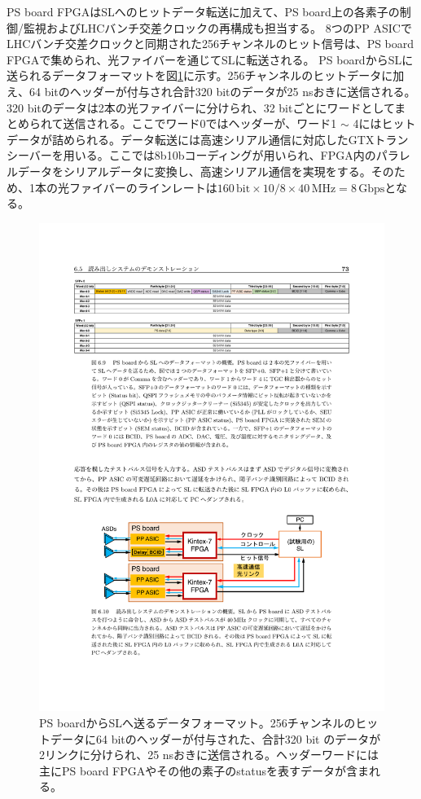     PS board FPGAはSLへのヒットデータ転送に加えて、PS board上の各素子の制御/監視およびLHCバンチ交差クロックの再構成も担当する。
    8つのPP ASICでLHCバンチ交差クロックと同期された256チャンネルのヒット信号は、PS board FPGAで集められ、光ファイバーを通じてSLに転送される。
    PS boardからSLに送られるデータフォーマットを図\ref{TGC_PSBuplink}に示す。256チャンネルのヒットデータに加え、64 bitのヘッダーが付与され合計320 bitのデータが25 nsおきに送信される。320 bitのデータは2本の光ファイバーに分けられ、32 bitごとにワードとしてまとめられて送信される。ここでワード0ではヘッダーが、ワード1 $\sim$ 4にはヒットデータが詰められる。データ転送には高速シリアル通信に対応したGTXトランシーバーを用いる。ここでは8b10bコーディングが用いられ、FPGA内のパラレルデータをシリアルデータに変換し、高速シリアル通信を実現をする。そのため、1本の光ファイバーのラインレートは$160 \, \mathrm{bit} \times 10/8 \times 40 \mathrm{\,MHz} = 8 \,\mathrm{Gbps}$となる。

    \begin{figure} 
    \centering
    \includegraphics[width=16cm]{fig/Intro/TGC_PSBuplink.pdf}
    \caption[PS boardからSLへ送るデータフォーマット]{PS boardからSLへ送るデータフォーマット\cite{mt_aoki}。256チャンネルのヒットデータに64 bitのヘッダーが付与された、合計320 bit のデータが2リンクに分けられ、25 nsおきに送信される。ヘッダーワードには主にPS board FPGAやその他の素子のstatusを表すデータが含まれる。}
    \label{TGC_PSBuplink}
    \end{figure}

